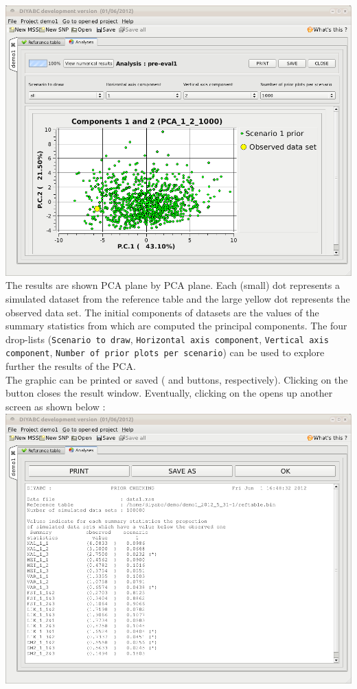 \includegraphics[scale=0.35]{gui_pictures/Capture-DIYABC-32.png} \\

The results are shown PCA plane by PCA plane. Each (small) dot represents a simulated dataset from the reference table and the large yellow dot represents the observed data set. The initial components of datasets are the values of the summary statistics from which are computed the principal components. The four drop-lists (\texttt{Scenario to draw}, \texttt{Horizontal axis component}, \texttt{Vertical axis component}, \texttt{Number of prior plots per scenario}) can be used to explore further the results of the PCA.\\
The graphic can be printed or saved ( and  buttons, respectively). Clicking on the  button closes the result window. Eventually, clicking on the  opens up another screen as shown below :\\

\includegraphics[scale=0.35]{gui_pictures/Capture-DIYABC-33.png} \\


